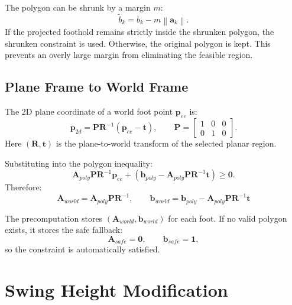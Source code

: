 \documentclass[11pt,a4paper]{article}
\newcommand{\norm}[1]{\left\| #1 \right\|}
\begin{document}
The polygon can be shrunk by a margin $m$:
\begin{equation}
	\tilde{b}_k
	=
	b_k
	-
	m\norm{\bm{a}_k}.
\end{equation}
If the projected foothold remains strictly inside the shrunken polygon, the shrunken constraint is used. Otherwise, the original polygon is kept. This prevents an overly large margin from eliminating the feasible region.

\subsection{Plane Frame to World Frame}

The 2D plane coordinate of a world foot point $\bm{p}_{ee}$ is:
\begin{equation}
	\bm{p}_{2d}
	=
	\bm{P}
	\bm{R}^{-1}
	(\bm{p}_{ee}-\bm{t}),
	\qquad
	\bm{P}
	=
	\begin{bmatrix}
		1&0&0\\
		0&1&0
	\end{bmatrix}.
\end{equation}
Here $(\bm{R},\bm{t})$ is the plane-to-world transform of the selected planar region.

Substituting into the polygon inequality:
\begin{equation}
	\bm{A}_{poly}\bm{P}\bm{R}^{-1}\bm{p}_{ee}
	+
	\left(
		\bm{b}_{poly}
		-
		\bm{A}_{poly}\bm{P}\bm{R}^{-1}\bm{t}
	\right)
	\geq
	\bm{0}.
\end{equation}
Therefore:
\begin{equation}
	\boxed{
		\bm{A}_{world}
		=
		\bm{A}_{poly}\bm{P}\bm{R}^{-1},
		\qquad
		\bm{b}_{world}
		=
		\bm{b}_{poly}
		-
		\bm{A}_{poly}\bm{P}\bm{R}^{-1}\bm{t}
	}
\end{equation}

The precomputation stores $(\bm{A}_{world},\bm{b}_{world})$ for each foot. If no valid polygon exists, it stores the safe fallback:
\begin{equation}
	\bm{A}_{safe}=\bm{0},
	\qquad
	\bm{b}_{safe}=\bm{1},
\end{equation}
so the constraint is automatically satisfied.


\section{Swing Height Modification}
\end{document}
